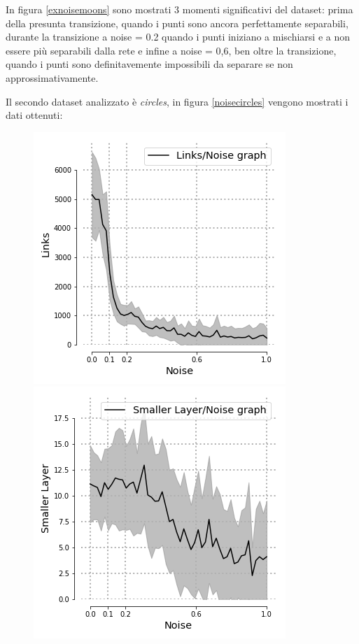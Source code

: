 \documentclass[12pt,a4paper]{report}
\begin{document}
In figura \ref{exnoisemoons} sono mostrati 3 momenti significativi del dataset: prima della presunta transizione, quando i punti sono ancora perfettamente separabili, durante la transizione a noise = 0.2 quando i punti iniziano a mischiarsi e a  non essere più separabili dalla rete e infine a noise = 0,6, ben oltre la transizione, quando i punti sono definitavemente impossibili da separare se non approssimativamente.

\newpage

Il secondo dataset analizzato è \textit{circles}, in figura \ref{noisecircles} vengono mostrati i dati ottenuti:

\begin{figure}[H]
 \centering
 \includegraphics[scale = 0.5]{images/links_noise_circles}
 \includegraphics[scale = 0.5]{images/small_noise_circles}

\end{figure}
\end{document}
